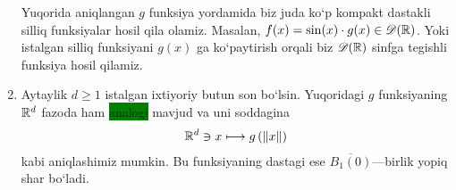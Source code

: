 \begin{example}
\begin{enumerate}
\begin{minipage}{0.89\textwidth}
\begin{minipage}[b]{0.45\textwidth}
\begin{figure}[H]
        \end{figure}
        \break
        \break
    \end{minipage}
    \end{minipage}
\break
Yuqorida aniqlangan $g$ funksiya yordamida biz juda ko`p kompakt dastakli sil\-liq funksiyalar hosil qila olamiz. Masalan, $f(x)=\sin(x)\cdot g(x)\in\mathscr{D}(\mathbb{R})$. Yoki istalgan silliq funksiyani $g(x)$ ga ko`paytirish orqali biz $\mathscr{D}(\mathbb{R})$ sinfga tegishli funksiya hosil qilamiz.
\item Aytaylik $d\ge 1$ istalgan ixtiyoriy butun son bo`lsin. Yuqoridagi $g$ funksiyaning ${\mathbb{R}^{d}}$ fazoda ham \colorbox{green}{analogi} mavjud va uni soddagina 
\begin{align*}
    {\mathbb{R}^{d}} \ni x\longmapsto g\left(\lVert x\rVert\right)
\end{align*}
kabi aniqlashimiz mumkin. Bu funksiyaning dastagi ese $\overline{B_1(0)}$---birlik yopiq shar bo`ladi.
\end{enumerate}
\end{example}

 